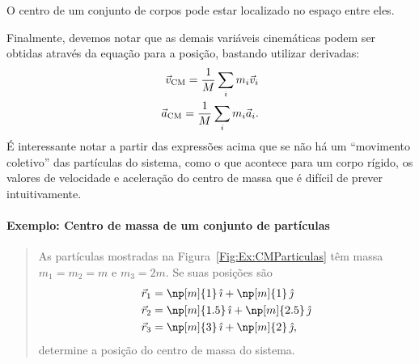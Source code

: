 \begin{marginfigure}
\centering
{}
\caption{O centro de um conjunto de corpos pode estar localizado no espaço entre eles.}
\end{marginfigure}

Finalmente, devemos notar que as demais variáveis cinemáticas podem ser obtidas através da equação para a posição, bastando utilizar derivadas:
\begin{align}
    \vec{v}_{\rm{CM}} = \frac{1}{M} \sum_{i} m_i \vec{v}_i \label{Eq:VelCMPart}\\
    \vec{a}_{\rm{CM}} = \frac{1}{M} \sum_{i} m_i \vec{a}_i. \label{Eq:AcelCMPart}
\end{align}
%
É interessante notar a partir das expressões acima que se não há um ``movimento coletivo'' das partículas do sistema, como o que acontece para um corpo rígido, os valores de velocidade e aceleração do centro de massa que é difícil de prever intuitivamente.

\paragraph{Exemplo: Centro de massa de um conjunto de partículas}

\begin{quote}
    As partículas mostradas na Figura~\ref{Fig:Ex:CMParticulas} têm massa $m_1 = m_2 = m$ e $m_3 = 2m$. Se suas posições são
        \begin{align}
            \vec{r}_1 &= \np[m]{1} \, \versi + \np[m]{1} \, \versj \\
            \vec{r}_2 &= \np[m]{1.5} \, \versi + \np[m]{2.5} \, \versj \\
            \vec{r}_3 &= \np[m]{3} \, \versi + \np[m]{2} \, \versj,
        \end{align}
determine a posição do centro de massa do sistema.
\end{quote}

